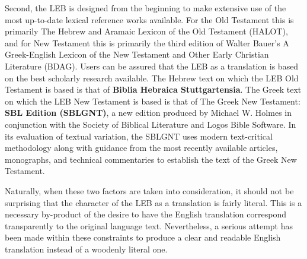 Second, the LEB is designed from the beginning to make extensive use of the most up-to-date lexical reference works 
available. For the Old Testament this is primarily The Hebrew and Aramaic Lexicon of the Old Testament (HALOT), and for 
New Testament this is primarily the third edition of Walter Bauer's A Greek-English Lexicon of the New Testament and 
Other Early Christian Literature (BDAG). Users can be assured that the LEB as a translation is based on the best scholarly 
research available. The Hebrew text on which the LEB Old Testament is based is that of \textbf{Biblia Hebraica Stuttgartensia}. 
The Greek text on which the LEB New Testament is based is that of The Greek New Testament: \textbf{SBL Edition (SBLGNT)}, a new 
edition produced by Michael W. Holmes in conjunction with the Society of Biblical Literature and Logos Bible Software. 
In its evaluation of textual variation, the SBLGNT uses modern text-critical methodology along with guidance from the 
most recently available articles, monographs, and technical commentaries to establish the text of the Greek New Testament.\par
\newpage
Naturally, when these two factors are taken into consideration, it should not be surprising that the character of the LEB 
as a translation is fairly literal. This is a necessary by-product of the desire to have the English translation correspond 
transparently to the original language text. Nevertheless, a serious attempt has been made within these constraints to produce 
a clear and readable English translation instead of a woodenly literal one.\par

